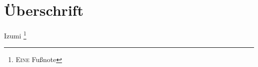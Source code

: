 \documentclass{article}
\begin{document}
    \section{Überschrift}
    Izumi \footnote{\textsc{Eine} Fußnote}
\end{document}

